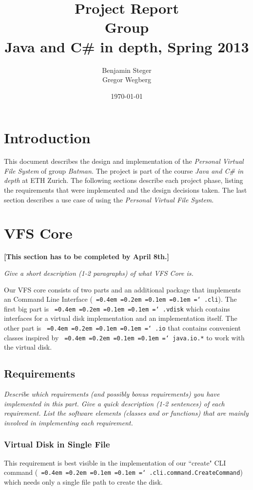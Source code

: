 \documentclass[a4paper,12pt]{article}
\title{
Project Report \\ 
Group \groupname \\
\vspace{5mm}
\large Java and C\# in depth, Spring 2013
}
\author{
Benjamin Steger \\
Gregor Wegberg \\
}
\date{\today}
\newcommand{\groupname}{Batman\xspace}
\newcommand*\justify{%
  \fontdimen2\font=0.4em%
  \fontdimen3\font=0.2em%
  \fontdimen4\font=0.1em%
  \fontdimen7\font=0.1em%
  \hyphenchar\font=`\-%
}
\newcommand{\package}[1]{\texttt{\justify #1}}
\begin{document}
\maketitle

\section{Introduction}

This document describes the design and implementation of the \emph{Personal Virtual File System} of group \emph{\groupname}. The project is part of the course \emph{Java and C\# in depth} at ETH Zurich. The following sections describe each project phase, listing the requirements that were implemented and the design decisions taken. The last section describes a use case of using the \emph{Personal Virtual File System}.


\section{VFS Core}

\textbf{[This section has to be completed by April 8th.]}

\emph{Give a short description (1-2 paragraphs) of what VFS Core is.}

Our VFS core consists of two parts and an additional package that implements an Command Line Interface (\package{.cli}). The first big part is \package{.vdisk} which contains interfaces for a virtual disk implementation and an implementation itself. The other part is \package{.io} that contains convenient classes inspired by \package{java.io.*} to work with the virtual disk.

\subsection{Requirements}

\emph{Describe which requirements (and possibly bonus requirements) you have implemented in this part. Give a quick description (1-2 sentences) of each requirement. List the software elements (classes and or functions) that are mainly involved in implementing each requirement.}

\subsubsection{Virtual Disk in Single File}
This requirement is best visible in the implementation of our ``create" CLI command (\package{.cli.command.CreateCommand}) which needs only a single file path to create the disk.
\end{document}
